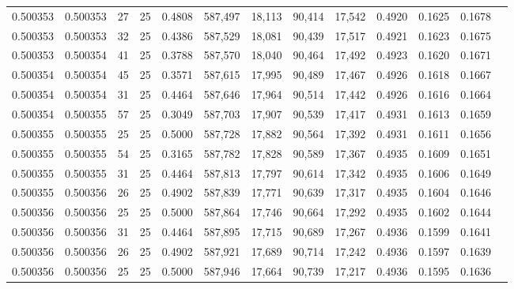 \begin{tabular}{rrrrrrrrrrrrr}
0.500353 & 0.500353 &    27 &  25 &                                     0.4808 & 587,497 &  18,113 &  90,414 &  17,542 & 0.4920 & 0.1625 & 0.1678 \\
0.500353 & 0.500353 &    32 &  25 &                                     0.4386 & 587,529 &  18,081 &  90,439 &  17,517 & 0.4921 & 0.1623 & 0.1675 \\
0.500353 & 0.500354 &    41 &  25 &                                     0.3788 & 587,570 &  18,040 &  90,464 &  17,492 & 0.4923 & 0.1620 & 0.1671 \\
0.500354 & 0.500354 &    45 &  25 &                                     0.3571 & 587,615 &  17,995 &  90,489 &  17,467 & 0.4926 & 0.1618 & 0.1667 \\
0.500354 & 0.500354 &    31 &  25 &                                     0.4464 & 587,646 &  17,964 &  90,514 &  17,442 & 0.4926 & 0.1616 & 0.1664 \\
0.500354 & 0.500355 &    57 &  25 &                                     0.3049 & 587,703 &  17,907 &  90,539 &  17,417 & 0.4931 & 0.1613 & 0.1659 \\
0.500355 & 0.500355 &    25 &  25 &                                     0.5000 & 587,728 &  17,882 &  90,564 &  17,392 & 0.4931 & 0.1611 & 0.1656 \\
0.500355 & 0.500355 &    54 &  25 &                                     0.3165 & 587,782 &  17,828 &  90,589 &  17,367 & 0.4935 & 0.1609 & 0.1651 \\
0.500355 & 0.500355 &    31 &  25 &                                     0.4464 & 587,813 &  17,797 &  90,614 &  17,342 & 0.4935 & 0.1606 & 0.1649 \\
0.500355 & 0.500356 &    26 &  25 &                                     0.4902 & 587,839 &  17,771 &  90,639 &  17,317 & 0.4935 & 0.1604 & 0.1646 \\
0.500356 & 0.500356 &    25 &  25 &                                     0.5000 & 587,864 &  17,746 &  90,664 &  17,292 & 0.4935 & 0.1602 & 0.1644 \\
0.500356 & 0.500356 &    31 &  25 &                                     0.4464 & 587,895 &  17,715 &  90,689 &  17,267 & 0.4936 & 0.1599 & 0.1641 \\
0.500356 & 0.500356 &    26 &  25 &                                     0.4902 & 587,921 &  17,689 &  90,714 &  17,242 & 0.4936 & 0.1597 & 0.1639 \\
0.500356 & 0.500356 &    25 &  25 &                                     0.5000 & 587,946 &  17,664 &  90,739 &  17,217 & 0.4936 & 0.1595 & 0.1636 \\

\end{tabular}
